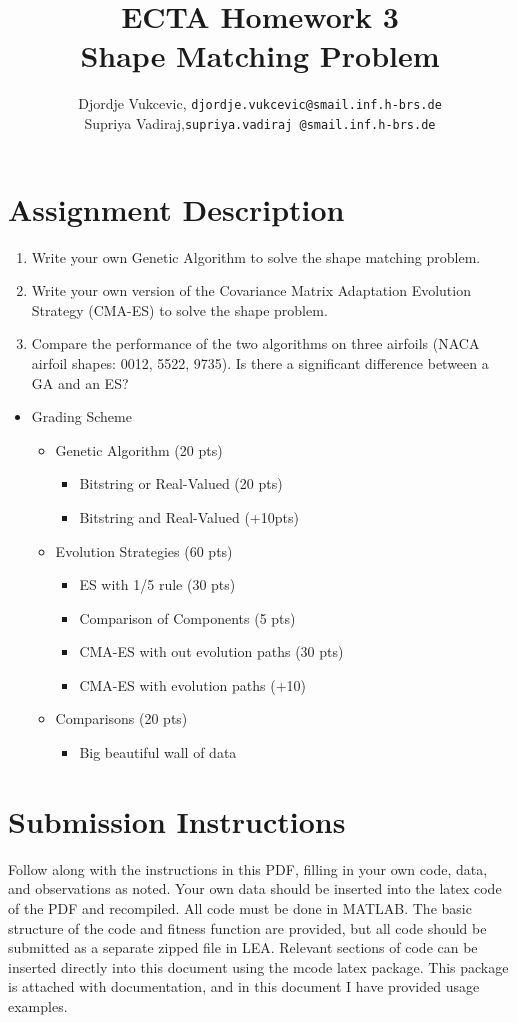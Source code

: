 \documentclass{article}
\title{ECTA Homework 3\\Shape Matching Problem}
\author{\color{red} Djordje Vukcevic, \texttt{djordje.vukcevic@smail.inf.h-brs.de}\\
\color{red}	Supriya Vadiraj,\texttt{supriya.vadiraj @smail.inf.h-brs.de}}
\begin{document}
\maketitle
\section{Assignment Description}
	\begin{enumerate}
		\item Write your own Genetic Algorithm to solve the shape matching problem.
		\item Write your own version of the Covariance Matrix Adaptation Evolution Strategy (CMA-ES) to solve the shape problem.
		\item Compare the performance of the two algorithms on three airfoils (NACA airfoil shapes: 0012, 5522, 9735). Is there a significant difference between a GA and an ES?
	\end{enumerate}

	\begin{itemize}
  	\item Grading Scheme
  		\begin{itemize}
  		\item Genetic Algorithm (20 pts)
  			\begin{itemize}
  			\item Bitstring or Real-Valued (20 pts)
  			\item Bitstring and Real-Valued (+10pts)
  			\end{itemize}
  		\item Evolution Strategies (60 pts)
  		  	\begin{itemize}
  			\item ES with 1/5 rule (30 pts)
  			\item Comparison of Components (5 pts)
  			\item CMA-ES with out evolution paths (30 pts)
  			\item CMA-ES with evolution paths (+10)
  			\end{itemize}
  		\item Comparisons (20 pts)
  		  	\begin{itemize}
  			\item Big beautiful wall of data
  			\end{itemize}
  		\end{itemize}
	\end{itemize}
\newpage


\section{Submission Instructions}
Follow along with the instructions in this PDF, filling in your own code, data, and observations as noted. Your own data should be inserted into the latex code of the PDF and recompiled. All code must be done in MATLAB. The basic structure of the code and fitness function are provided, but all code should be submitted as a separate zipped file in LEA. Relevant sections of code can be inserted directly into this document using the mcode latex package. This package is attached with documentation, and in this document I have provided usage examples.
\end{document}
